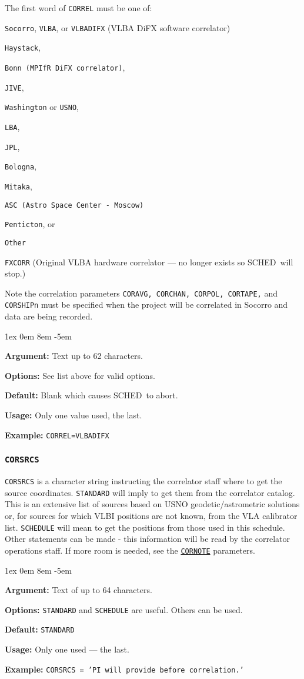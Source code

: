 \documentclass{report}
\newcommand{\schedb}{{\sc SCHED~}}
\newcommand{\rcwbox}[5]{
  \begin{list}{}{\parsep 1ex  \itemsep 0em
                 \leftmargin 8em  \itemindent -5em }
    \item {\bf Argument:} #1
    \item {\bf Options:}  #2
    \item {\bf Default:}  #3
    \item {\bf Usage:}    #4
    \item {\bf Example:}  #5
  \end{list}
}
\begin{document}
The first word of {\tt CORREL} must be one of:
\begin{list}{}{\parsep 0em  \itemsep 0em }
\item {\tt Socorro}, {\tt VLBA}, or {\tt VLBADIFX}
(VLBA DiFX software correlator)
\item {\tt Haystack},
\item {\tt Bonn (MPIfR DiFX correlator)},
\item {\tt JIVE},
\item {\tt Washington} or {\tt USNO},
\item {\tt LBA},
\item {\tt JPL},
\item {\tt Bologna},
\item {\tt Mitaka},
\item {\tt ASC (Astro Space Center - Moscow)}
\item {\tt Penticton}, or
\item {\tt Other}
\item {\tt FXCORR} (Original VLBA hardware correlator --- no longer 
exists so \schedb will stop.)
\end{list}

Note the correlation parameters {\tt CORAVG, CORCHAN,
CORPOL, CORTAPE,} and {\tt CORSHIPn} must be specified when
the project will be correlated in Socorro and data
are being recorded.

\rcwbox
{Text up to 62 characters.}
{See list above for valid options.}
{Blank which causes \schedb to abort.}
{Only one value used, the last.}
{{\tt CORREL=VLBADIFX}}


\subsubsection{\label{MP:CORSRCS}{\tt CORSRCS}}

{\tt CORSRCS} is a character string instructing the correlator
staff where to get the source coordinates.  {\tt STANDARD}
will imply to get them from the correlator catalog.  This is
an extensive list of sources based on USNO geodetic/astrometric
solutions or, for sources for which VLBI positions are not
known, from the VLA calibrator list.  {\tt SCHEDULE} will
mean to get the positions from those used in this schedule.
Other statements can be made - this information will be
read by the correlator operations staff.  If more room is
needed, see the 
{\hyperref[MP:CORNOTE]{{\tt CORNOTE}}} parameters.

\rcwbox
{Text of up to 64 characters.}
{{\tt STANDARD} and {\tt SCHEDULE} are useful.  Others can be
used.}
{{\tt STANDARD}}
{Only one used --- the last.}
{{\tt CORSRCS = 'PI will provide before correlation.'}}
\end{document}
